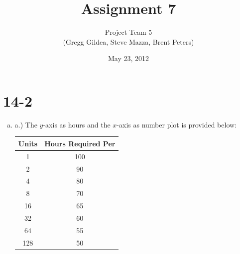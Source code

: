 \documentclass[letterpaper,10pt]{article}
\title{Assignment 7}
\author{Project Team 5 \\ { \small (Gregg Gildea, Steve Mazza, Brent Peters)}}
\date{May 23, 2012}
\begin{document}
\maketitle

\section*{14-2}
\begin{enumerate}[a.]
\item a.)	The $y$-axis as hours and the $x$-axis as number plot is provided below:
\begin{center}
	\begin{tabular}{cc}
	\hline
	\textbf{Units} & \textbf{Hours Required Per} \\
	\hline\hline
	1 & 100 \\
	2 & 90 \\
	4 & 80 \\
	8 & 70 \\
	16 & 65 \\
	32 & 60 \\
	64 & 55 \\
	128 & 50 \\
	\hline
	\end{tabular}
	

\end{center}
\end{enumerate}
\end{document}
